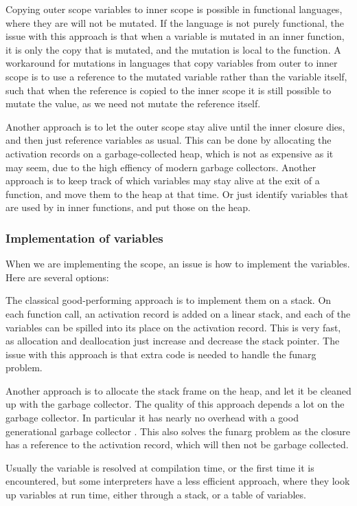 \documentclass[11pt]{report}
\begin{document}
Copying outer scope variables to inner scope is possible in functional languages, where they are will not be mutated. If the language is not purely functional, the issue with this approach is that when a variable is mutated in an inner function, it is only the copy that is mutated, and the mutation is local to the function.
A workaround for mutations in languages that copy variables from outer to inner scope is to use a reference to the mutated variable rather than the variable itself, such that when the reference is copied to the inner scope it is still possible to mutate the value, as we need not mutate the reference itself.

Another approach is to let the outer scope stay alive until the inner closure dies, and then just reference variables as usual.
This can be done by allocating the activation records on a garbage-collected heap,
which is not as expensive as it may seem, due to the high effiency of modern garbage collectors.
Another approach is to keep track of which variables may stay alive at the exit of a function, and move them to the heap at that time.
Or just identify variables that are used by in inner functions, and put those on the heap.

\subsubsection{Implementation of variables}
When we are implementing the scope, an issue is how to implement the variables. 
Here are several options: 

The  classical good-performing approach is to implement them on a stack. On each function call, an activation record is added on a linear stack, and each of the variables can be spilled into its place on the activation record. This is very fast, as allocation and deallocation just increase and decrease the stack pointer. The issue with this approach is that extra code is needed to handle the funarg problem.

Another approach is to allocate the stack frame on the heap, and let it be cleaned up with the garbage collector. The quality of this approach depends a lot on the garbage collector. In particular it has nearly no overhead with a good generational garbage collector \cite{generational-heap}.
This also solves the funarg problem as the closure has a reference to the activation record, which will then not be garbage collected.

Usually the variable is resolved at compilation time, or the first time it is encountered, but 
some interpreters have a less efficient approach, where they look up variables at run time, either through a stack, or a table of variables.
\end{document}
